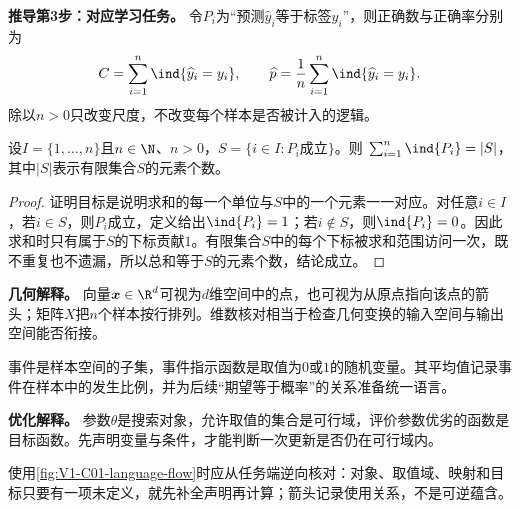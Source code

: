 \textbf{推导第3步：对应学习任务。} 令$P_i$为“预测$\widehat y_i$等于标签$y_i$”，则正确数与正确率分别为
\[
C=\sum_{i=1}^{n}\ind\{\widehat y_i=y_i\},\qquad
\widehat p=\frac1n\sum_{i=1}^{n}\ind\{\widehat y_i=y_i\}.
\]
除以$n>0$只改变尺度，不改变每个样本是否被计入的逻辑。

\begin{theorem}[有限指示和的计数性质]\label{thm:V1-C01-indicator-count}\label{schema:V1-C01:CH-12}
设$I=\{1,\ldots,n\}$且$n\in\N$、$n>0$，$S=\{i\in I:P_i\text{成立}\}$。则
$\sum_{i=1}^{n}\ind\{P_i\}=|S|$，其中$|S|$表示有限集合$S$的元素个数。
\end{theorem}
\begin{proof}\label{schema:V1-C01:CH-13}
证明目标是说明求和的每一个单位与$S$中的一个元素一一对应。对任意$i\in I$，若$i\in S$，则$P_i$成立，定义给出$\ind\{P_i\}=1$；若$i\notin S$，则$\ind\{P_i\}=0$。因此求和时只有属于$S$的下标贡献$1$。有限集合$S$中的每个下标被求和范围访问一次，既不重复也不遗漏，所以总和等于$S$的元素个数，结论成立。
\end{proof}

\begin{geometrybox}\label{schema:V1-C01:CH-14}
\textbf{几何解释。} 向量$\boldsymbol{x}\in\R^d$可视为$d$维空间中的点，也可视为从原点指向该点的箭头；矩阵$X$把$n$个样本按行排列。维数核对相当于检查几何变换的输入空间与输出空间能否衔接。
\end{geometrybox}
\begin{probabilitybox}\label{schema:V1-C01:CH-15}
事件是样本空间的子集，事件指示函数是取值为$0$或$1$的随机变量。其平均值记录事件在样本中的发生比例，并为后续“期望等于概率”的关系准备统一语言。
\end{probabilitybox}
\begin{optimizationbox}\label{schema:V1-C01:CH-16}
\textbf{优化解释。} 参数$\theta$是搜索对象，允许取值的集合是可行域，评价参数优劣的函数是目标函数。先声明变量与条件，才能判断一次更新是否仍在可行域内。
\end{optimizationbox}


使用\cref{fig:V1-C01-language-flow}时应从任务端逆向核对：对象、取值域、映射和目标只要有一项未定义，就先补全声明再计算；箭头记录使用关系，不是可逆蕴含。

